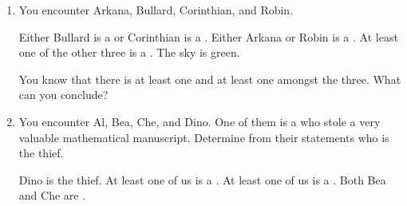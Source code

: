 \probsec{~\ref{sec:conjunctions}}
\begin{enumerate}
  \item You encounter Arkana, Bullard, Corinthian, and Robin.
  \begin{dialogue}
     Either Bullard is a \knight or Corinthian is a \knave.
     Either Arkana or Robin is a \knave.
     At least one of the other three is a \knave.
     The sky is green.
  \end{dialogue}
  You know that there is at least one \knight and at least one \knave amongst the three. What can you conclude?

  \item You encounter Al, Bea, Che, and Dino. One of them is a \knave who stole a very valuable mathematical manuscript. Determine from their statements who is the thief.
  \begin{dialogue}
     Dino is the thief.
     At least one of us is a \knight.
     At least one of us is a \knave.
     Both Bea and Che are \knights.
  \end{dialogue}

\end{enumerate}
